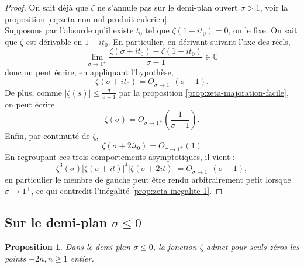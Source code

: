 \documentclass[french]{report}
\newtheorem{proposition}[theorem]{Proposition}
\begin{document}
\begin{proof}
  On sait déjà que $\zeta$ ne s'annule pas sur le demi-plan ouvert $\sigma>1$, voir la proposition \ref{eq:zeta-non-nul-produit-eulerien}.
  \\

  Supposons par l'absurde qu'il existe $t_0$ tel que $\zeta(1+it_0)=0$, on le fixe. On sait que $\zeta$ est dérivable en $1+it_0$. En particulier, en dérivant suivant l'axe des réels,
  \[ \lim_{\sigma\to1^+}\frac{\zeta(\sigma+it_0)-\zeta(1+it_0)}{\sigma-1}\in\mathbb{C}\]
  donc on peut écrire, en appliquant l'hypothèse,
  \[ \zeta(\sigma+it_0)=O_{\sigma\to1^+}(\sigma-1). \]
  De plus, comme $|\zeta(s)|\leq\frac{\sigma}{\sigma-1}$ par la proposition \ref{prop:zeta-majoration-facile}, on peut écrire
  \[ \zeta(\sigma) = O_{\sigma\to1^+}\left(\frac{1}{\sigma-1}\right). \]
  Enfin, par continuité de $\zeta$,
  \[ \zeta(\sigma+2it_0) = O_{\sigma\to1^+}(1) \]
  En regroupant ces trois comportements asymptotiques, il vient :
  \[ \zeta^3(\sigma)|\zeta(\sigma+it)|^4|\zeta(\sigma+2it)| = O_{\sigma\to1^+}(\sigma-1), \]
  en particulier le membre de gauche peut être rendu arbitrairement petit lorsque $\sigma\to1^+$, ce qui contredit l'inégalité \ref{prop:zeta-inegalite-1}.
\end{proof}

\subsection{Sur le demi-plan $\sigma\leq 0$}

\begin{proposition}
  Dans le demi-plan $\sigma\leq0$, la fonction $\zeta$ admet pour seuls zéros les points $-2n, n\geq1$ entier.
\end{proposition}
\end{document}
